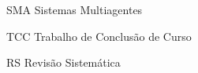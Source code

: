 \begin{siglas}
  \item[SMA] Sistemas Multiagentes
  \item[TCC] Trabalho de Conclusão de Curso
  \item[RS] Revisão Sistemática
\end{siglas}
